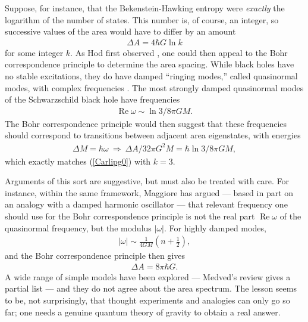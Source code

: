 \documentclass[12pt]{article}
\begin{document}
Suppose, for instance, that the Bekenstein-Hawking entropy were 
\emph{exactly} the logarithm of the number of states.  This number
is, of course, an integer, so successive values of the area would have to 
differ by an amount
\begin{align}
\Delta A = 4\hbar G\ln k
\label{Carlipg0}
\end{align}
for some integer $k$.  As Hod first observed \cite{Hod}, one could then
appeal to the Bohr correspondence principle to determine the area
spacing.  While black holes have no stable excitations, they do have 
damped ``ringing modes,'' called quasinormal modes, with complex 
frequencies \cite{Siopsis}.  The most strongly damped quasinormal 
modes of the Schwarzschild black hole have frequencies
\begin{align}
\mathop{Re}\omega \sim \ln 3/8\pi GM   .
\label{Carlipg01}
\end{align}
The Bohr correspondence principle would then suggest that these
frequencies should correspond to transitions between adjacent area 
eigenstates,
with energies
\begin{align}
\Delta M =  \hbar\omega \ \Rightarrow \
\Delta A/32\pi G^2 M = \hbar\ln 3/8\pi GM  ,
\label{Carlipg02}
\end{align}
which exactly matches (\ref{Carlipg0}) with $k=3$.

Arguments of this sort are suggestive, but must also be treated with
care.  For instance, within the same framework, Maggiore \cite{Magg}
has argued --- based in part on an analogy with a damped harmonic
oscillator --- that relevant frequency one should use for the Bohr
correspondence principle is not the real part $\mathop{Re}\omega$
of the quasinormal frequency, but the modulus $|\omega|$.  For
highly damped modes,
\begin{align}
|\omega| \sim  \frac{1}{4GM} \left(n+\frac{1}{2}\right)   ,
\label{Carlipg03}
\end{align}
and the Bohr correspondence principle then gives
\begin{align}
\Delta A = 8\pi\hbar G   .
\label{Carlipg04}
\end{align}
A wide range of simple models have been explored --- Medved's
review \cite{Medved} gives a partial list --- and they do not agree
about the area spectrum.  The lesson seems to be, not surprisingly, 
that thought experiments and analogies can only go so far; one needs
 a genuine quantum theory of gravity to obtain a real answer.
\end{document}
